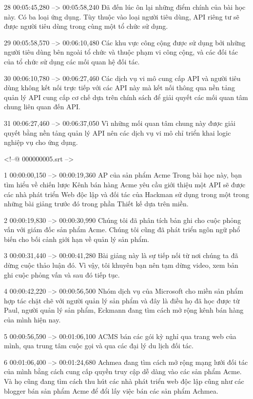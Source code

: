28
00:05:45,280 --> 00:05:58,240
Đã đến lúc ôn lại những điểm chính của bài học này.  Có ba loại ứng dụng.  Tùy thuộc vào loại người tiêu dùng, API riêng tư sẽ được người tiêu dùng trong cùng một tổ chức sử dụng.

29
00:05:58,570 --> 00:06:10,480
Các khu vực công cộng được sử dụng bởi những người tiêu dùng bên ngoài tổ chức và thuộc phạm vi công cộng, và các đối tác của tổ chức sử dụng các mối quan hệ đối tác.

30
00:06:10,780 --> 00:06:27,460
Các dịch vụ vi mô cung cấp API và người tiêu dùng không kết nối trực tiếp với các API này mà kết nối thông qua nền tảng quản lý API cung cấp cơ chế dựa trên chính sách để giải quyết các mối quan tâm chung liên quan đến API.

31
00:06:27,460 --> 00:06:37,050
Vì những mối quan tâm chung này được giải quyết bằng nền tảng quản lý API nên các dịch vụ vi mô chỉ triển khai logic nghiệp vụ cho ứng dụng.

<!--@ 000000005.srt -->

1
00:00:00,150 --> 00:00:19,360
AP của sản phẩm Acme Trong bài học này, bạn tìm hiểu về chiến lược Kênh bán hàng Acme yêu cầu giới thiệu một API sẽ được các nhà phát triển Web độc lập và đối tác của Hackman sử dụng trong một trong những bài giảng trước đó trong phần Thiết kế dựa trên miền.

2
00:00:19,830 --> 00:00:30,990
Chúng tôi đã phân tích bản ghi cho cuộc phỏng vấn với giám đốc sản phẩm Acme.  Chúng tôi cũng đã phát triển ngôn ngữ phổ biến cho bối cảnh giới hạn về quản lý sản phẩm.

3
00:00:31,440 --> 00:00:41,280
Bài giảng này là sự tiếp nối từ nơi chúng ta đã dừng cuộc thảo luận đó.  Vì vậy, tôi khuyên bạn nên tạm dừng video, xem bản ghi cuộc phỏng vấn và sau đó tiếp tục.

4
00:00:42,220 --> 00:00:56,500
Nhóm dịch vụ của Microsoft cho miền sản phẩm hợp tác chặt chẽ với người quản lý sản phẩm và đây là điều họ đã học được từ Paul, người quản lý sản phẩm, Eckmann đang tìm cách mở rộng kênh bán hàng của mình hiện nay.

5
00:00:56,590 --> 00:01:06,100
ACMS bán các gói kỳ nghỉ qua trang web của mình, qua trung tâm cuộc gọi và qua các đại lý du lịch đối tác.

6
00:01:06,400 --> 00:01:24,680
Achmea đang tìm cách mở rộng mạng lưới đối tác của mình bằng cách cung cấp quyền truy cập dễ dàng vào các sản phẩm Acme.  Và họ cũng đang tìm cách thu hút các nhà phát triển web độc lập cũng như các blogger bán sản phẩm Acme để đổi lấy việc bán các sản phẩm Achmea.

